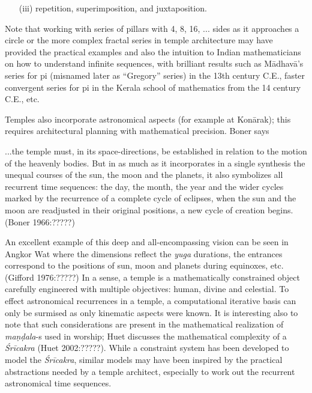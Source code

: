 \begin{itemize}
\item[(iii)] repetition, superimposition, and juxtaposition.
\end{itemize}

Note that working with series of pillars with 4, 8, 16, ... sides as it approaches a circle or the more complex fractal series in temple architecture may have provided the practical examples and also the intuition to Indian mathematicians on how to understand infinite sequences, with brilliant results such as Mādhavā’s series for pi (misnamed later as “Gregory” series) in the 13th century C.E., faster convergent series for pi in the Kerala school of mathematics from the 14 century C.E., etc.

Temples also incorporate astronomical aspects (for example at Konārak); this requires architectural planning with mathematical precision. Boner says 

\begin{myquote}
...the temple must, in its space-directions, be established in relation to the motion of the heavenly bodies. But in as much as it incorporates in a single synthesis the unequal courses of the sun, the moon and the planets, it also symbolizes all recurrent time sequences: the day, the month, the year and the wider cycles marked by the recurrence of a complete cycle of eclipses, when the sun and the moon are readjusted in their original positions, a new cycle of creation begins. 
\hfill(Boner 1966:?????)
\end{myquote}

An excellent example of this deep and all-encompassing vision can be seen in Angkor Wat where the dimensions reflect the \textsl{yuga} durations, the entrances correspond to the positions of sun, moon and planets during equinoxes, etc. (Gifford 1976:?????) In a sense, a temple is a mathematically constrained object carefully engineered with multiple objectives: human, divine and celestial. To effect astronomical recurrences in a temple, a computational iterative basis can only be surmised as only kinematic aspects were known. It is interesting also to note that such considerations are present in the mathematical realization of \textsl{maṇḍala}-s used in worship; Huet discusses the mathematical complexity of a \textsl{Śrīcakra} (Huet 2002:?????). While a constraint system has been developed to model the \textsl{Śrīcakra}, similar models may have been inspired by the practical abstractions needed by a temple architect, especially to work out the recurrent astronomical time sequences.\\[-20pt]


